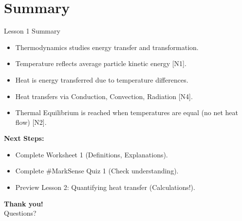 \documentclass[xcolor=svgnames]{beamer}
\begin{document}
\section{Summary}
\begin{frame}{Lesson 1 Summary}
    \begin{itemize}
        \item Thermodynamics studies energy transfer and transformation.
        \item Temperature reflects average particle kinetic energy [N1].
        \item Heat is energy transferred due to temperature differences.
        \item Heat transfers via Conduction, Convection, Radiation [N4].
        \item Thermal Equilibrium is reached when temperatures are equal (no net heat flow) [N2].
    \end{itemize}
    \vspace{1em}
    \textbf{Next Steps:}
    \begin{itemize}
        \item Complete Worksheet 1 (Definitions, Explanations).
        \item Complete \#MarkSense Quiz 1 (Check understanding).
        \item Preview Lesson 2: Quantifying heat transfer (Calculations!).
    \end{itemize}
\end{frame}

\begin{frame}
    \centering
    \textbf{Thank you!}\\
    Questions?
\end{frame}
\end{document}
